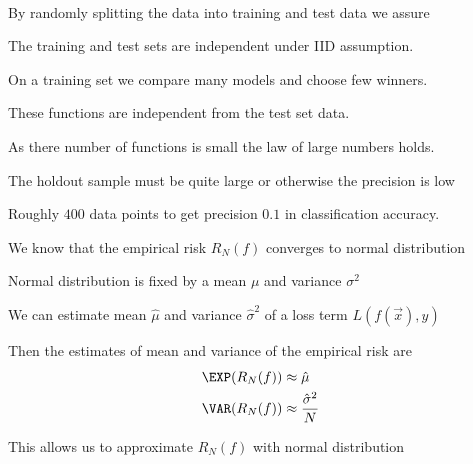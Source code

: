 \documentclass[landscape,footrule]{foils}
\begin{document}


\

By randomly splitting the data into training and test data we assure
\begin{triangles}
\item The training and test sets are independent under IID assumption.
\item On a training set we compare many models and  choose few winners. 
\item These functions are independent from the test set data.
\item As there number of functions is small the law of large numbers holds. 
\end{triangles}




The holdout sample must be quite large or otherwise the precision is low
\begin{triangles}
\item Roughly $400$ data points to get precision $0.1$ in classification accuracy.
\end{triangles}



We know that the empirical risk $R_N(f)$ converges to normal distribution
\begin{triangles}
\item Normal distribution is fixed by a mean $\mu$ and variance $\sigma^2$
\item We can estimate mean $\hat{\mu}$ and variance $\hat{\sigma}^2$ of a loss term $L(f(\vec{x}), y)$ 
\item Then the estimates of mean and variance of the empirical risk are
\begin{align*}
\EXP(R_N(f))&\approx \hat{\mu}\\
\VAR(R_N(f))&\approx \frac{\hat{\sigma}^2}{N}
\end{align*}
\item This allows us to approximate $R_N(f)$ with normal distribution 
\end{triangles}




\end{document}
